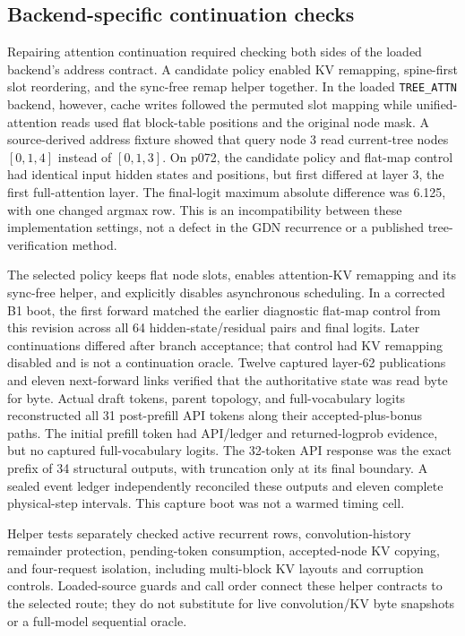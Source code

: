 \documentclass[conference]{IEEEtran}
\begin{document}
\subsection{Backend-specific continuation checks}
\label{sec:selected-route}
Repairing attention continuation required checking both sides of the loaded backend's address contract. A candidate policy enabled KV remapping, spine-first slot reordering, and the sync-free remap helper together. In the loaded \texttt{TREE\_ATTN} backend, however, cache writes followed the permuted slot mapping while unified-attention reads used flat block-table positions and the original node mask. A source-derived address fixture showed that query node 3 read current-tree nodes $[0,1,4]$ instead of $[0,1,3]$. On p072, the candidate policy and flat-map control had identical input hidden states and positions, but first differed at layer 3, the first full-attention layer. The final-logit maximum absolute difference was 6.125, with one changed argmax row. This is an incompatibility between these implementation settings, not a defect in the GDN recurrence or a published tree-verification method.

The selected policy keeps flat node slots, enables attention-KV remapping and its sync-free helper, and explicitly disables asynchronous scheduling. In a corrected B1 boot, the first forward matched the earlier diagnostic flat-map control from this revision across all 64 hidden-state/residual pairs and final logits. Later continuations differed after branch acceptance; that control had KV remapping disabled and is not a continuation oracle. Twelve captured layer-62 publications and eleven next-forward links verified that the authoritative state was read byte for byte. Actual draft tokens, parent topology, and full-vocabulary logits reconstructed all 31 post-prefill API tokens along their accepted-plus-bonus paths. The initial prefill token had API/ledger and returned-logprob evidence, but no captured full-vocabulary logits. The 32-token API response was the exact prefix of 34 structural outputs, with truncation only at its final boundary. A sealed event ledger independently reconciled these outputs and eleven complete physical-step intervals. This capture boot was not a warmed timing cell.

Helper tests separately checked active recurrent rows, convolution-history remainder protection, pending-token consumption, accepted-node KV copying, and four-request isolation, including multi-block KV layouts and corruption controls. Loaded-source guards and call order connect these helper contracts to the selected route; they do not substitute for live convolution/KV byte snapshots or a full-model sequential oracle.
\end{document}
